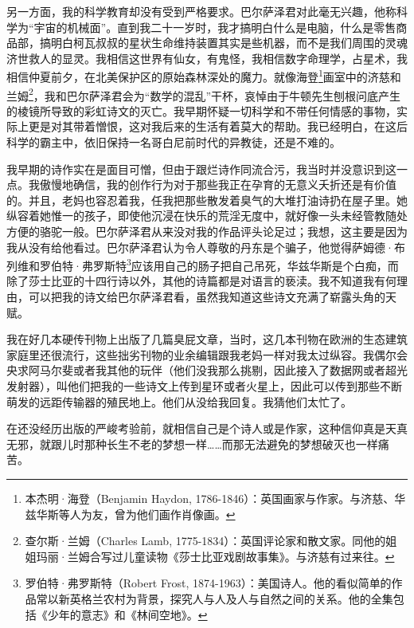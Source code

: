 \documentclass[AutoFakeBold=true]{book}
\begin{document}
另一方面，我的科学教育却没有受到严格要求。巴尔萨泽君对此毫无兴趣，他称科学为``宇宙的机械面''。直到我二十一岁时，我才搞明白什么是电脑，什么是零售商品部，搞明白柯瓦叔叔的星状生命维持装置其实是些机器，而不是我们周围的灵魂济世救人的显灵。我相信这世界有仙女，有鬼怪，我相信数字命理学，占星术，我相信仲夏前夕，在北美保护区的原始森林深处的魔力。就像海登\footnote{本杰明·海登（Benjamin Haydon, 1786-1846）：英国画家与作家。与济慈、华兹华斯等人为友，曾为他们画作肖像画。}画室中的济慈和兰姆\footnote{查尔斯·兰姆（Charles Lamb, 1775-1834）：英国评论家和散文家。同他的姐姐玛丽·兰姆合写过儿童读物《莎士比亚戏剧故事集》。与济慈有过来往。}，我和巴尔萨泽君会为``数学的混乱''干杯，哀悼由于牛顿先生刨根问底产生的棱镜所导致的彩虹诗文的灭亡。我早期怀疑一切科学和不带任何情感的事物，实际上更是对其带着憎恨，这对我后来的生活有着莫大的帮助。我已经明白，在这后科学的霸主中，依旧保持一名哥白尼前时代的异教徒，还是不难的。

\vspace*{1em}

我早期的诗作实在是面目可憎，但由于跟烂诗作同流合污，我当时并没意识到这一点。我傲慢地确信，我的创作行为对于那些我正在孕育的无意义夭折还是有价值的。并且，老妈也容忍着我，任我把那些散发着臭气的大堆打油诗扔在屋子里。她纵容着她惟一的孩子，即使他沉浸在快乐的荒淫无度中，就好像一头未经管教随处方便的骆驼一般。巴尔萨泽君从来没对我的作品评头论足过；我想，这主要是因为我从没有给他看过。巴尔萨泽君认为令人尊敬的丹东是个骗子，他觉得萨姆德·布列维和罗伯特·弗罗斯特\footnote{罗伯特·弗罗斯特（Robert Frost, 1874-1963）：美国诗人。他的看似简单的作品常以新英格兰农村为背景，探究人与人及人与自然之间的关系。他的全集包括《少年的意志》和《林间空地》。}应该用自己的肠子把自己吊死，华兹华斯是个白痴，而除了莎士比亚的十四行诗以外，其他的诗篇都是对语言的亵渎。我不知道我有何理由，可以把我的诗文给巴尔萨泽君看，虽然我知道这些诗文充满了崭露头角的天赋。

我在好几本硬传刊物上出版了几篇臭屁文章，当时，这几本刊物在欧洲的生态建筑家庭里还很流行，这些拙劣刊物的业余编辑跟我老妈一样对我太过纵容。我偶尔会央求阿马尔斐或者我其他的玩伴（他们没我那么挑剔，因此接入了数据网或者超光发射器），叫他们把我的一些诗文上传到星环或者火星上，因此可以传到那些不断萌发的远距传输器的殖民地上。他们从没给我回复。我猜他们太忙了。

在还没经历出版的严峻考验前，就相信自己是个诗人或是作家，这种信仰真是天真无邪，就跟儿时那种长生不老的梦想一样……而那无法避免的梦想破灭也一样痛苦。

\vspace*{1em}
\end{document}
